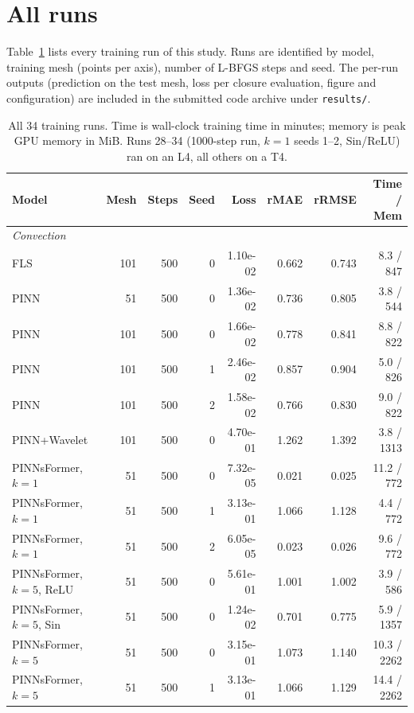 \appendix
\section{All runs}
Table~\ref{tab:allruns} lists every training run of this study. Runs are identified by model, training mesh (points per axis), number of L-BFGS steps and seed. The per-run outputs (prediction on the test mesh, loss per closure evaluation, figure and configuration) are included in the submitted code archive under \texttt{results/}.

\begin{table}[ht]
\caption{All 34 training runs. Time is wall-clock training time in minutes; memory is peak GPU memory in MiB. Runs 28--34 (1000-step run, $k=1$ seeds 1--2, Sin/ReLU) ran on an L4, all others on a T4.}
\label{tab:allruns}
\begin{center}
\scriptsize
\begin{tabular}{l r r r r r r r}
\toprule
Model & Mesh & Steps & Seed & Loss & rMAE & rRMSE & Time / Mem \\
\midrule
\multicolumn{8}{l}{\textit{Convection}} \\
FLS & 101 & 500 & 0 & 1.10e-02 & 0.662 & 0.743 & 8.3 / 847 \\
PINN & 51 & 500 & 0 & 1.36e-02 & 0.736 & 0.805 & 3.8 / 544 \\
PINN & 101 & 500 & 0 & 1.66e-02 & 0.778 & 0.841 & 8.8 / 822 \\
PINN & 101 & 500 & 1 & 2.46e-02 & 0.857 & 0.904 & 5.0 / 826 \\
PINN & 101 & 500 & 2 & 1.58e-02 & 0.766 & 0.830 & 9.0 / 822 \\
PINN+Wavelet & 101 & 500 & 0 & 4.70e-01 & 1.262 & 1.392 & 3.8 / 1313 \\
PINNsFormer, $k=1$ & 51 & 500 & 0 & 7.32e-05 & 0.021 & 0.025 & 11.2 / 772 \\
PINNsFormer, $k=1$ & 51 & 500 & 1 & 3.13e-01 & 1.066 & 1.128 & 4.4 / 772 \\
PINNsFormer, $k=1$ & 51 & 500 & 2 & 6.05e-05 & 0.023 & 0.026 & 9.6 / 772 \\
PINNsFormer, $k=5$, ReLU & 51 & 500 & 0 & 5.61e-01 & 1.001 & 1.002 & 3.9 / 586 \\
PINNsFormer, $k=5$, Sin & 51 & 500 & 0 & 1.24e-02 & 0.701 & 0.775 & 5.9 / 1357 \\
PINNsFormer, $k=5$ & 51 & 500 & 0 & 3.15e-01 & 1.073 & 1.140 & 10.3 / 2262 \\
PINNsFormer, $k=5$ & 51 & 500 & 1 & 3.13e-01 & 1.066 & 1.129 & 14.4 / 2262 \\

\end{tabular}
\end{center}
\end{table}
